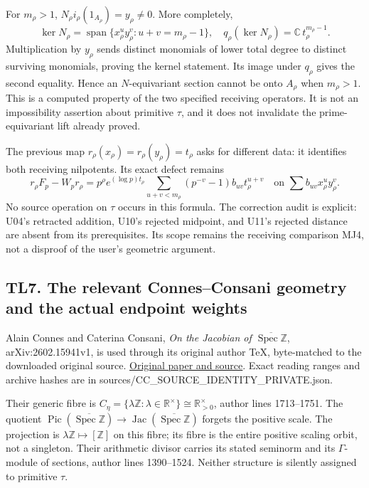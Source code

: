 For \(m_\rho>1\), \(N_\rho i_\rho(1_{A_\rho})=y_\rho\ne0\). More
completely, \[
\ker N_\rho=
\operatorname{span}\{x_\rho^u y_\rho^v:u+v=m_\rho-1\},
\quad
q_\rho(\ker N_\rho)=\mathbb C\,t_\rho^{m_\rho-1}.
\tag{TL6.1}
\] Multiplication by \(y_\rho\) sends distinct monomials of lower total
degree to distinct surviving monomials, proving the kernel statement.
Its image under \(q_\rho\) gives the second equality. Hence an
\(N\)-equivariant section cannot be onto \(A_\rho\) when \(m_\rho>1\).
This is a computed property of the two specified receiving operators. It
is not an impossibility assertion about primitive \(\tau\), and it does
not invalidate the prime-equivariant lift already proved.

The previous map \(r_\rho(x_\rho)=r_\rho(y_\rho)=t_\rho\) asks for
different data: it identifies both receiving nilpotents. Its exact
defect remains \[
r_\rho F_p-W_pr_\rho
=p^\rho e^{(\log p)t_\rho}
\sum_{u+v<m_\rho}(p^{-v}-1)b_{uv}t_\rho^{u+v}
\quad\text{on }\sum b_{uv}x_\rho^uy_\rho^v.
\tag{TL6.2}
\] No source operation on \(\tau\) occurs in this formula. The
correction audit is explicit: U04's retracted addition, U10's rejected
midpoint, and U11's rejected distance are absent from its prerequisites.
Its scope remains the receiving comparison MJ4, not a disproof of the
user's geometric argument.

\subsection{TL7. The relevant Connes--Consani geometry and the actual
endpoint
weights}\label{tl7.-the-relevant-connesconsani-geometry-and-the-actual-endpoint-weights}

Alain Connes and Caterina Consani, \emph{On the Jacobian of
\(\overline{\operatorname{Spec}\mathbb Z}\)}, arXiv:2602.15941v1, is
used through its original author TeX, byte-matched to the downloaded
original source. \href{https://arxiv.org/abs/2602.15941v1}{Original
paper and source}. Exact reading ranges and archive hashes are in
sources/CC\_SOURCE\_IDENTITY\_PRIVATE.json.

Their generic fibre is
\(C_\eta=\{\lambda\mathbb Z:\lambda\in\mathbb R^\times\}\cong\mathbb R_{>0}^\times\),
author lines 1713--1751. The quotient
\(\operatorname{Pic}(\overline{\operatorname{Spec}\mathbb Z})\to\operatorname{Jac}(\overline{\operatorname{Spec}\mathbb Z})\)
forgets the positive scale. The projection is
\(\lambda\mathbb Z\mapsto[\mathbb Z]\) on this fibre; its fibre is the
entire positive scaling orbit, not a singleton. Their arithmetic divisor
carries its stated seminorm and its \(\Gamma\)-module of sections,
author lines 1390--1524. Neither structure is silently assigned to
primitive \(\tau\).

